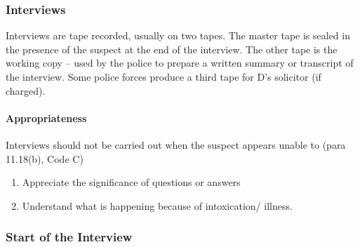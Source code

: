 \documentclass[
]{article}
\providecommand{\tightlist}{%
  \setlength{\itemsep}{0pt}\setlength{\parskip}{0pt}}
\begin{document}
\hypertarget{interviews}{%
\subsubsection{Interviews}\label{interviews}}

Interviews are tape recorded, usually on two tapes. The master tape is
sealed in the presence of the suspect at the end of the interview. The
other tape is the working copy -- used by the police to prepare a
written summary or transcript of the interview. Some police forces
produce a third tape for D's solicitor (if charged).

\hypertarget{appropriateness}{%
\paragraph{Appropriateness}\label{appropriateness}}

Interviews should not be carried out when the suspect appears unable to
(para 11.18(b), Code C)

\begin{enumerate}
\def\labelenumi{\arabic{enumi}.}
\tightlist
\item
  Appreciate the significance of questions or answers
\item
  Understand what is happening because of intoxication/ illness.
\end{enumerate}

\hypertarget{start-of-the-interview}{%
\subsubsection{Start of the Interview}\label{start-of-the-interview}}
\end{document}
